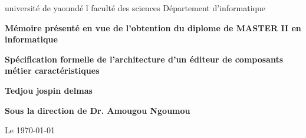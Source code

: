 \begin{titlepage}
\parindent=0pt
université de yaoundé l  faculté des sciences%
Département d'informatique  
\hrulefill
\begin{center} \bfseries\Huge
 Mémoire présenté en vue de l'obtention du diplome de MASTER II en informatique
\end{center}
\hrulefill
\vspace*{1cm}
\begin{center} \bfseries\Large
Spécification  formelle de l'architecture d'un éditeur de composants métier caractéristiques
\end{center}
\begin{center} \bfseries\Large
Tedjou jospin delmas
\end{center}
\begin{center} \bfseries\Large
Sous la direction de Dr. Amougou Ngoumou
\end{center}
\begin{flushright}
 Le \today
\end{flushright}
\end{titlepage}
